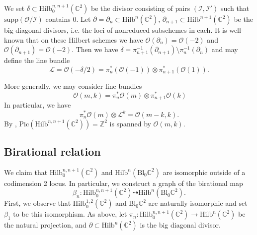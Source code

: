 \documentclass[12pt]{amsart}
\newcommand{\Hilb}{\mathrm{Hilb}}
\newcommand{\C}{\mathbb{C}}
\newcommand{\Z}{\mathbb{Z}}
\newcommand{\CL}{\mathcal{L}}
\newcommand{\CO}{\mathcal{O}}
\newcommand{\Pic}{\mathrm{Pic}}
\newcommand{\Bl}{\mathrm{Bl}}
\numberwithin{equation}{section}
\theoremstyle{definition}
\begin{document}

We set \(\delta\subset \Hilb^{n,n+1}_0(\C^2)\) be the divisor consisting of pairs \((\mathcal{I},\mathcal{I}')\) such that
\(\mathrm{supp}(\CO/\mathcal{I})\) contains \(0\). Let \(\partial=\partial_n\subset \Hilb^n(\C^2)\), \(\partial_{n+1}\subset \Hilb^{n+1}(\C^2)\)
be the big diagonal divisors, i.e. the loci of nonreduced subschemes in each. It is well-known that on these Hilbert schemes we have $\CO(\partial_n) = \CO(-2)$ and $\CO(\partial_{n+1}) = \CO(-2)$. Then we have \(\delta=\pi_{n+1}^{-1}(\partial_{n+1})\setminus\pi_{n}^{-1}(\partial_n)\) and may define the line bundle
\[\mathcal{L}=\CO(-\delta/2)=\pi_n^*(\CO(-1))\otimes \pi_{n+1}^*(\CO(1)). \]


More generally, we may consider line bundles
$$\
\CO(m,k) = \pi_n^* \CO(m)\otimes \pi_{n+1}^*\CO(k)
$$
In particular, we have %
\begin{equation}
\label{eq: O(m) L notation}
\pi_n^*\CO(m)\otimes \CL^{k}=\CO(m-k,k).
\end{equation}
By \cite{Ryan}, $\Pic(\Hilb^{n,n+1}(\C^2))=\Z^2$ is spanned by $\CO(m,k)$.




\subsection{Birational relation}

We claim that $\Hilb^{n,n+1}_0(\C^2)$ and $\Hilb^n (\mathrm{Bl}_0 \C^2)$ are isomorphic outside of a codimension 2 locus.
In particular, we construct a graph of the birational  map \[\beta_n: \Hilb_0^{n,n+1}(\C^2)\dashrightarrow \Hilb^n(\Bl_0\C^2).\]
First, we observe that \(\Hilb_0^{1,2}(\C^2)\) and \(\Bl_0\C^2\) are naturally isomorphic and set \(\beta_1\) to be this isomorphism.
As above, let \(\pi_n:\Hilb^{n,n+1}_0(\C^2)\to \Hilb^n(\C^2)\) be the natural projection, and \(\partial \subset \Hilb^n(\C^2)\) is the big diagonal divisor. 
\end{document}
